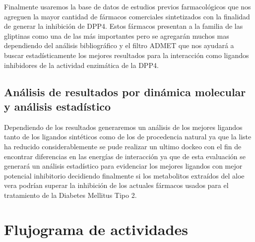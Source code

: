 Finalmente usaremos la base de datos de estudios previos farmacológicos que nos agreguen la mayor cantidad de fármacos comerciales sintetizados con la finalidad de generar la inhibición de DPP4. Estos fármacos presentan a la familia de las gliptinas como una de las más importantes pero se agregarán muchos mas dependiendo del análisis bibliográfico y el filtro ADMET que nos ayudará a buscar estadísticamente los mejores resultados para la interacción como ligandos inhibidores de la actividad enzimática de la DPP4. 

\subsection{Análisis de resultados por dinámica molecular y análisis estadístico}
Dependiendo de los resultados generaremos un análisis de los mejores ligandos tanto de los ligandos sintéticos como de los de procedencia natural ya que la liste ha reducido considerablemente se pude realizar un ultimo dockeo con el fin de encontrar diferencias en las energías de interacción ya que de esta evaluación se generará un análisis estadístico para evidenciar los mejores ligandos con mejor potencial inhibitorio decidiendo finalmente si los metabolitos extraídos del aloe vera podrían superar la inhibición de los actuales fármacos usados para el tratamiento de la Diabetes Mellitus Tipo 2.

\section{Flujograma de actividades }




